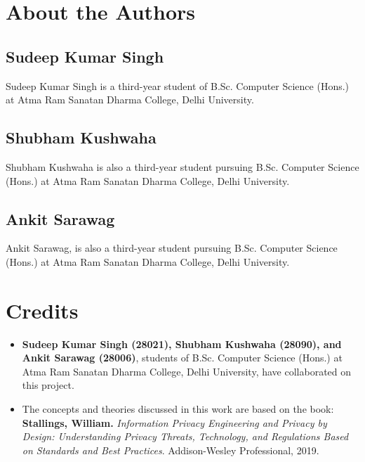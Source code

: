 \newpage
\section*{About the Authors}
\subsection*{Sudeep Kumar Singh}
Sudeep Kumar Singh is a third-year student of B.Sc. Computer Science (Hons.) at Atma Ram Sanatan Dharma College, Delhi University. 

\subsection*{Shubham Kushwaha}
Shubham Kushwaha is also a third-year student pursuing B.Sc. Computer Science (Hons.) at Atma Ram Sanatan Dharma College, Delhi University. 

\subsection*{Ankit Sarawag}
Ankit Sarawag, is also a third-year student pursuing B.Sc. Computer Science (Hons.) at Atma Ram Sanatan Dharma College, Delhi University. 

\newpage
\section*{Credits}
\begin{itemize}
    \item \textbf{Sudeep Kumar Singh (28021), Shubham Kushwaha (28090), and Ankit Sarawag (28006)}, students of B.Sc. Computer Science (Hons.) at Atma Ram Sanatan Dharma College, Delhi University, have collaborated on this project.
    
    \item The concepts and theories discussed in this work are based on the book:  
    \textbf{Stallings, William.} \textit{Information Privacy Engineering and Privacy by Design: Understanding Privacy Threats, Technology, and Regulations Based on Standards and Best Practices}. Addison-Wesley Professional, 2019.
\end{itemize}


